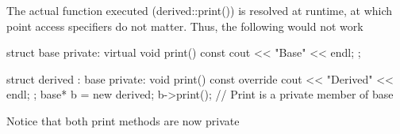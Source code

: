 \documentclass{report}
\begin{document}
The actual function executed (derived::print()) is resolved at runtime, at which point access specifiers do not matter.
\bigbreak \noindent 
Thus, the following would not work
\bigbreak \noindent 
\begin{cppcode}
    struct base {
        private:
        virtual void print() const {cout << "Base" << endl;}
    };

    struct derived : base{
        private:
        void print() const override {cout << "Derived" << endl;}
    };
    base* b = new derived{};
    b->print(); // Print is a private member of base
\end{cppcode}
\bigbreak \noindent 
Notice that both print methods are now private
\bigbreak \noindent 




 
\end{document}
